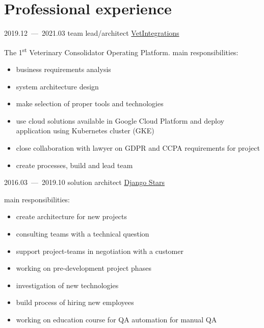 \documentclass[11pt,a4paper,oneside]{moderncv}
\begin{document}
    \section{Professional experience}

        \cventry
            {2019.12~---~2021.03}
            {team lead/architect}
            {\href{http://vetintegrations.com/}{VetIntegrations}}
            {}{}
            {
              The 1\textsuperscript{st} Veterinary Consolidator Operating Platform.\newline
              main responsibilities:
              \begin{itemize}
                \item business requirements analysis
                \item system architecture design
                \item make selection of proper tools and technologies
                \item use cloud solutions available in Google Cloud Platform and deploy application using Kubernetes cluster (GKE)
                \item close collaboration with lawyer on GDPR and CCPA requirements for project
                \item create processes, build and lead team
              \end{itemize}
            }

        \cventry
            {2016.03~---~2019.10}
            {solution architect}
            {\href{http://djangostars.com}{Django Stars}}
            {}{}
            {
              main responsibilities:
              \begin{itemize}
                \item create architecture for new projects
                \item consulting teams with a technical question
                \item support project-teams in negotiation with a customer
                \item working on pre-development project phases
                \item investigation of new technologies
                \item build process of hiring new employees
                \item working on education course for QA automation for manual QA
              \end{itemize}
            }
\end{document}
